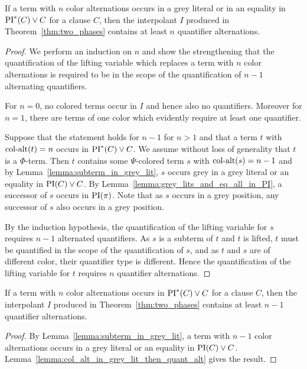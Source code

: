 \documentclass[%
	draft=false,%
	numbers=noendperiod,%
	11pt,%
	a4paper,%
	oneside,%
	openany,%
]{memoir}
\begin{document}
\begin{lemma}
	\label{lemma:col_alt_in_grey_lit_then_quant_alt}
	If a term with $n$ color alternations occurs in a grey literal or in an equality in $\operatorname{PI}^*(C) \lor C$ for a clause $C$, then the interpolant $I$ produced in Theorem~\ref{thm:two_phases} contains at least $n$ quantifier alternations.
\end{lemma}
\begin{proof}
	We perform an induction on $n$
	and show the strengthening that
	the quantification of the lifting variable which replaces a term with $n$ color alternations is required to be in the scope of the quantification of $n-1$ alternating quantifiers.

	For $n=0$, no colored terms occur in $I$ and hence also no quantifiers.
	Moreover for $n=1$, there are terms of one color which evidently require at least one quantifier.

	Suppose that the statement holds for $n-1$ for $n>1$ and that a term $t$ with $\operatorname{col-alt}(t) = n$ occurs in $\operatorname{PI}^*(C) \lor C$.
	We assume without loss of generality that $t$ is a $\Phi$-term.
	Then $t$ contains some $\Psi$-colored term $s$ with $\operatorname{col-alt}(s) = n-1$ and
	by Lemma~\ref{lemma:subterm_in_grey_lit}, $s$ occurs grey in a grey literal or an equality in $\operatorname{PI}(C) \lor C$.
	By Lemma~\ref{lemma:grey_lits_and_eq_all_in_PI}, a successor of $s$ occurs in $\operatorname{PI}(\pi)$. Note that as $s$ occurs in a grey position, any successor of $s$ also occurs in a grey position.

	By the induction hypothesis, the quantification of the lifting variable for $s$ requires $n-1$ alternated quantifiers.
	As $s$ is a subterm of $t$ and $t$ is lifted, $t$ must be quantified in the scope of the quantification of $s$, and as $t$ and $s$ are of different color, their quantifier type is different. 
	Hence the quantification of the lifting variable for $t$ requires $n$ quantifier alternations.
\end{proof}

\begin{prop}
	\label{prop:color_alt_eq_quant_alt}
	If a term with $n$ color alternations occurs in $\operatorname{PI}^*(C) \lor C$ for a clause $C$, then the interpolant $I$ produced in Theorem~\ref{thm:two_phases} contains at least $n-1$ quantifier alternations.
\end{prop}
\begin{proof}
	By Lemma~\ref{lemma:subterm_in_grey_lit}, a term with $n-1$ color alternations occurs in a grey literal or an equality in $\operatorname{PI}(C) \lor C$.
	Lemma~\ref{lemma:col_alt_in_grey_lit_then_quant_alt} gives the result.
\end{proof}
\end{document}
